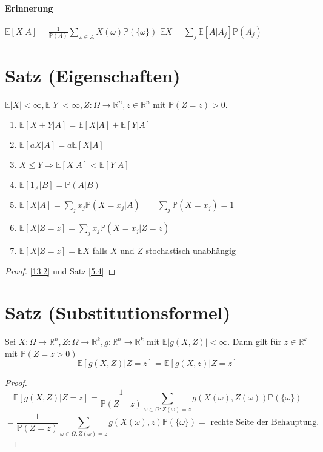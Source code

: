 \documentclass[a4paper,11pt,notitlepage]{report}
\newcommand{\R}{{\ensuremath{\mathbb{R}}}}
\newcommand{\Prim}{{\ensuremath{\mathbb{P}}}}
\newcommand{\E}{{\ensuremath{\mathbb{E}}}}
\begin{document}
\paragraph{Erinnerung}
$\E [X | A] = \frac{1}{\Prim(A)} \sum\limits_{\omega \in A}{X(\omega) \Prim(\{\omega\})}$
\newline
$\E X = \sum\limits_{j}{\E [A|A_j] \Prim(A_j)}$

\section{Satz (Eigenschaften)}
$\E |X| < \infty, \E |Y| < \infty, Z \colon \Omega \rightarrow \R^n, z \in \R^n$ mit $\Prim(Z=z)>0$.
\begin{enumerate}
	\item $\E [X+Y | A] = \E [X|A] + \E[Y | A]$
	\item $\E [aX | A] = a \E [X|A]$
	\item $X \leq Y \Rightarrow \E [X|A] < \E [Y|A]$
	\item $\E [1_A | B] = \Prim(A|B)$
	\item $\E [X| A] = \sum\limits_{j}{x_j \Prim(X= x_j | A)} \qquad \sum\limits_{j}{\Prim(X=x_j)}=1$
	\item $\E [X | Z=z] = \sum\limits_j{x_j \Prim(X=x_j | Z=z)}$
	\item $\E [X| Z=z] = \E X$ falls $X$ und $Z$ stochastisch unabhängig
\end{enumerate}

\begin{proof}
\ref{13.2} und Satz \ref{5.4}
\end{proof}

\section{Satz (Substitutionsformel)}
Sei $X \colon \Omega \rightarrow \R^n, Z \colon \Omega \rightarrow \R^k, g \colon \R^n \rightarrow \R^k$ mit $\E |g(X,Z)| < \infty$. Dann gilt für $z \in \R^k$ mit $\Prim(Z=z>0)$
$$\E [g(X,Z)| Z = z ] = \E [g(X,z) | Z=z]$$

\begin{proof}
	$$\E [g(X,Z)| Z = z ] = \frac{1}{\Prim(Z=z)} \sum\limits_{\omega \in \Omega \colon Z(\omega) = z}{g(X(\omega), Z(\omega)) \Prim(\{\omega\})}$$
	$$ = \frac{1}{\Prim(Z=z)} \sum\limits_{\omega \in \Omega \colon Z(\omega) = z}{g(X(\omega), z) \Prim(\{\omega\})} = \text{ rechte Seite der Behauptung.}$$
\end{proof}
\end{document}

